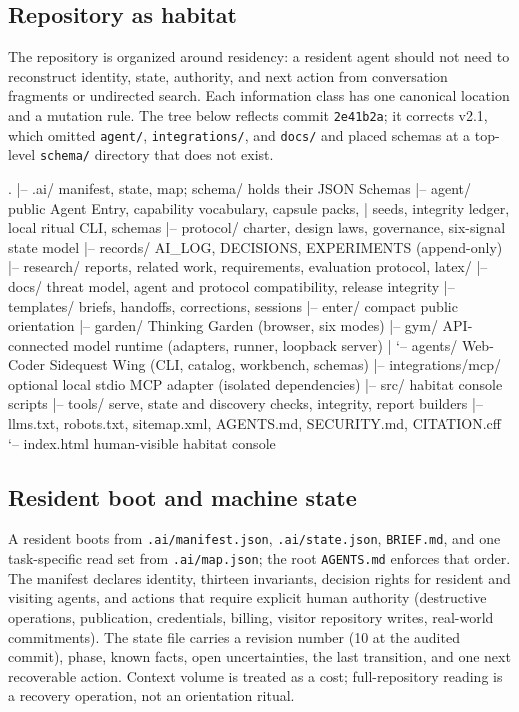 \documentclass{arxiv-neurips-single}
\newcommand{\p}[1]{\nolinkurl{#1}}
\begin{document}
\subsection{Repository as habitat}

The repository is organized around residency: a resident agent should not need to reconstruct identity, state, authority, and next action from conversation fragments or undirected search. Each information class has one canonical location and a mutation rule. The tree below reflects commit \texttt{2e41b2a}; it corrects v2.1, which omitted \p{agent/}, \p{integrations/}, and \p{docs/} and placed schemas at a top-level \p{schema/} directory that does not exist.

\begin{aossverbatim}
.
|-- .ai/              manifest, state, map; schema/ holds their JSON Schemas
|-- agent/            public Agent Entry, capability vocabulary, capsule packs,
|                     seeds, integrity ledger, local ritual CLI, schemas
|-- protocol/         charter, design laws, governance, six-signal state model
|-- records/          AI_LOG, DECISIONS, EXPERIMENTS (append-only)
|-- research/         reports, related work, requirements, evaluation protocol, latex/
|-- docs/             threat model, agent and protocol compatibility, release integrity
|-- templates/        briefs, handoffs, corrections, sessions
|-- enter/            compact public orientation
|-- garden/           Thinking Garden (browser, six modes)
|-- gym/              API-connected model runtime (adapters, runner, loopback server)
|   `-- agents/       Web-Coder Sidequest Wing (CLI, catalog, workbench, schemas)
|-- integrations/mcp/ optional local stdio MCP adapter (isolated dependencies)
|-- src/              habitat console scripts
|-- tools/            serve, state and discovery checks, integrity, report builders
|-- llms.txt, robots.txt, sitemap.xml, AGENTS.md, SECURITY.md, CITATION.cff
`-- index.html        human-visible habitat console
\end{aossverbatim}

\subsection{Resident boot and machine state}

A resident boots from \p{.ai/manifest.json}, \p{.ai/state.json}, \p{BRIEF.md}, and one task-specific read set from \p{.ai/map.json}; the root \p{AGENTS.md} enforces that order. The manifest declares identity, thirteen invariants, decision rights for resident and visiting agents, and actions that require explicit human authority (destructive operations, publication, credentials, billing, visitor repository writes, real-world commitments). The state file carries a revision number (10 at the audited commit), phase, known facts, open uncertainties, the last transition, and one next recoverable action. Context volume is treated as a cost; full-repository reading is a recovery operation, not an orientation ritual.
\end{document}
